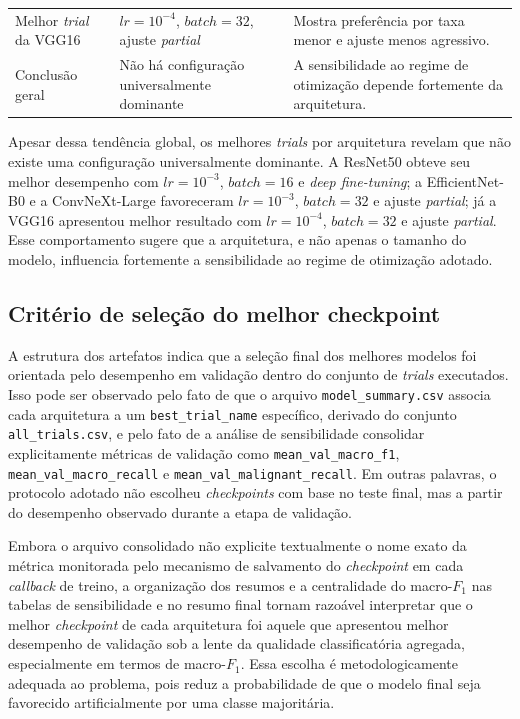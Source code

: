 \documentclass[tcc,capa]{texufpel}
\begin{document}
\begin{table}[htbp]
\begin{tabular}{p{4.2cm} p{5.2cm} p{5.2cm}}
		Melhor \textit{trial} da VGG16 & 
		\(lr = 10^{-4}\), \(batch = 32\), ajuste \textit{partial} &
		Mostra preferência por taxa menor e ajuste menos agressivo. \\
		
		Conclusão geral & 
		Não há configuração universalmente dominante &
		A sensibilidade ao regime de otimização depende fortemente da arquitetura. \\
		\bottomrule
	\end{tabular}
\end{table}

Apesar dessa tendência global, os melhores \textit{trials} por arquitetura revelam que não existe uma configuração universalmente dominante. A ResNet50 obteve seu melhor desempenho com \(lr = 10^{-3}\), \(batch = 16\) e \textit{deep fine-tuning}; a EfficientNet-B0 e a ConvNeXt-Large favoreceram \(lr = 10^{-3}\), \(batch = 32\) e ajuste \textit{partial}; já a VGG16 apresentou melhor resultado com \(lr = 10^{-4}\), \(batch = 32\) e ajuste \textit{partial}. Esse comportamento sugere que a arquitetura, e não apenas o tamanho do modelo, influencia fortemente a sensibilidade ao regime de otimização adotado.

\subsection{Critério de seleção do melhor checkpoint}

A estrutura dos artefatos indica que a seleção final dos melhores modelos foi orientada pelo desempenho em validação dentro do conjunto de \textit{trials} executados. Isso pode ser observado pelo fato de que o arquivo \texttt{model\_summary.csv} associa cada arquitetura a um \texttt{best\_trial\_name} específico, derivado do conjunto \texttt{all\_trials.csv}, e pelo fato de a análise de sensibilidade consolidar explicitamente métricas de validação como \texttt{mean\_val\_macro\_f1}, \texttt{mean\_val\_macro\_recall} e \texttt{mean\_val\_malignant\_recall}. Em outras palavras, o protocolo adotado não escolheu \textit{checkpoints} com base no teste final, mas a partir do desempenho observado durante a etapa de validação.

Embora o arquivo consolidado não explicite textualmente o nome exato da métrica monitorada pelo mecanismo de salvamento do \textit{checkpoint} em cada \textit{callback} de treino, a organização dos resumos e a centralidade do macro-\(F_1\) nas tabelas de sensibilidade e no resumo final tornam razoável interpretar que o melhor \textit{checkpoint} de cada arquitetura foi aquele que apresentou melhor desempenho de validação sob a lente da qualidade classificatória agregada, especialmente em termos de macro-\(F_1\). Essa escolha é metodologicamente adequada ao problema, pois reduz a probabilidade de que o modelo final seja favorecido artificialmente por uma classe majoritária.
\end{document}
